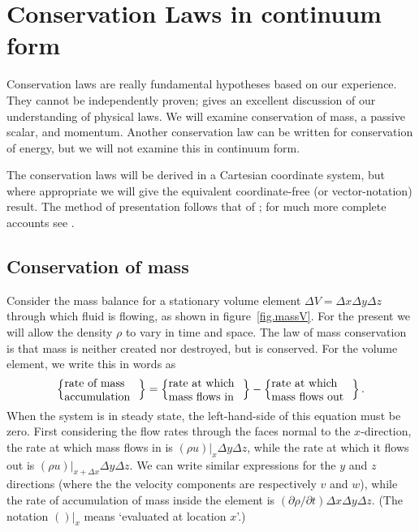 \documentclass[a4paper,11pt]		{report}
\begin{document}
\chapter{Conservation Laws in continuum form}
\label{ch.cons}

Conservation laws are really fundamental hypotheses based on our
experience. They cannot be independently proven; \citet{feynman67}
gives an excellent discussion of our understanding of physical
laws. We will examine conservation of mass, a passive scalar, and
momentum. Another conservation law can be written for conservation of
energy, but we will not examine this in continuum form. 

The conservation laws will be derived in a Cartesian coordinate
system, but where appropriate we will give the equivalent
coordinate-free (or vector-notation) result. The method of
presentation follows that of \citet*{bsl62}; for much more complete
accounts see \citet{aris62,bat67,fung69}.

\section{Conservation of mass}

Consider the mass balance for a stationary volume element $\Delta
V=\Delta x\Delta y\Delta z$ through which fluid is flowing, as shown
in figure~\ref{fig.massV}. For the present we will allow the density
$\rho$ to vary in time and space. The law of mass conservation is that
mass is neither created nor destroyed, but is conserved. For the
volume element, we write this in words as
\begin{equation}
\left\{ \parbox{23mm}{rate of mass\\ accumulation} \right\}=
\left\{ \parbox{23mm}{rate at which\\ mass flows in} \right\}-
\left\{ \parbox{25mm}{rate at which\\ mass flows out} \right\}.
\label{eq.mass_bal_words}
\end{equation}
When the system is in steady state, the left-hand-side of this
equation must be zero.  First considering the flow rates through the
faces normal to the $x$-direction, the rate at which mass flows in is
$(\rho u)|_x \Delta y\Delta z$, while the rate at which it flows out
is $(\rho u)|_{x + \Delta x} \Delta y\Delta z$. We can write similar
expressions for the $y$ and $z$ directions (where the the velocity
components are respectively $v$ and $w$), while the rate of
accumulation of mass inside the element is $(\partial \rho/\partial
t)\Delta x\Delta y\Delta z$. (The notation $()|_x$ means `evaluated at
location $x$'.)
\end{document}

